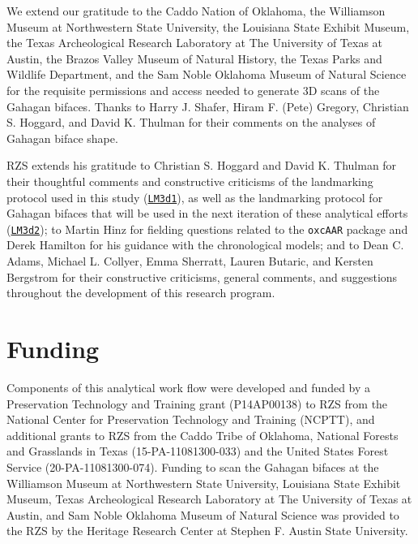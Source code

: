 \documentclass[]{interact}
\theoremstyle{plain}%
\theoremstyle{definition}
\theoremstyle{remark}
\begin{document}
We extend our gratitude to the Caddo Nation of Oklahoma, the Williamson
Museum at Northwestern State University, the Louisiana State Exhibit
Museum, the Texas Archeological Research Laboratory at The University of
Texas at Austin, the Brazos Valley Museum of Natural History, the Texas
Parks and Wildlife Department, and the Sam Noble Oklahoma Museum of
Natural Science for the requisite permissions and access needed to
generate 3D scans of the Gahagan bifaces. Thanks to Harry J. Shafer,
Hiram F. (Pete) Gregory, Christian S. Hoggard, and David K. Thulman for
their comments on the analyses of Gahagan biface shape.

RZS extends his gratitude to Christian S. Hoggard and David K. Thulman
for their thoughtful comments and constructive criticisms of the
landmarking protocol used in this study
(\href{https://github.com/aksel-blaise/gahaganmorph2/blob/master/analysis/landmarking-protocol.md}{\texttt{LM3d1}}),
as well as the landmarking protocol for Gahagan bifaces that will be
used in the next iteration of these analytical efforts
(\href{https://seldenlab.github.io/gahaganmorph.3/landmarking-protocol-3d2.html}{\texttt{LM3d2}});
to Martin Hinz for fielding questions related to the \texttt{oxcAAR}
package and Derek Hamilton for his guidance with the chronological
models; and to Dean C. Adams, Michael L. Collyer, Emma Sherratt, Lauren
Butaric, and Kersten Bergstrom for their constructive criticisms,
general comments, and suggestions throughout the development of this
research program.

\hypertarget{funding}{%
\section*{Funding}\label{funding}}

Components of this analytical work flow were developed and funded by a
Preservation Technology and Training grant (P14AP00138) to RZS from the
National Center for Preservation Technology and Training (NCPTT), and
additional grants to RZS from the Caddo Tribe of Oklahoma, National
Forests and Grasslands in Texas (15-PA-11081300-033) and the United
States Forest Service (20-PA-11081300-074). Funding to scan the Gahagan
bifaces at the Williamson Museum at Northwestern State University,
Louisiana State Exhibit Museum, Texas Archeological Research Laboratory
at The University of Texas at Austin, and Sam Noble Oklahoma Museum of
Natural Science was provided to the RZS by the Heritage Research Center
at Stephen F. Austin State University.
\end{document}
